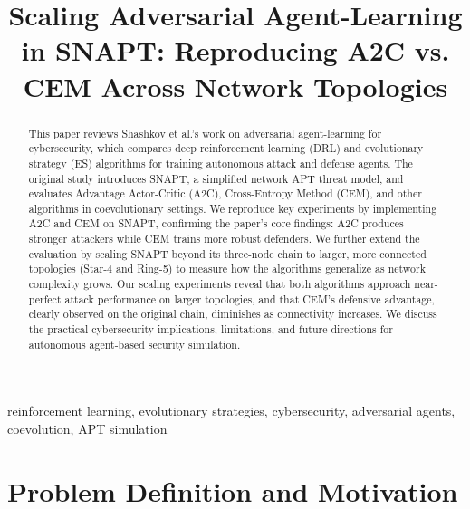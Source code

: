 \documentclass[conference, 10pt]{IEEEtran}
\begin{document}
\title{Scaling Adversarial Agent-Learning in SNAPT: Reproducing A2C vs. CEM Across Network Topologies}

\author{
}

\maketitle

\begin{abstract}
This paper reviews Shashkov et al.'s work on adversarial agent-learning for cybersecurity, which compares deep reinforcement learning (DRL) and evolutionary strategy (ES) algorithms for training autonomous attack and defense agents. The original study introduces SNAPT, a simplified network APT threat model, and evaluates Advantage Actor-Critic (A2C), Cross-Entropy Method (CEM), and other algorithms in coevolutionary settings. We reproduce key experiments by implementing A2C and CEM on SNAPT, confirming the paper's core findings: A2C produces stronger attackers while CEM trains more robust defenders. We further extend the evaluation by scaling SNAPT beyond its three-node chain to larger, more connected topologies (Star-4 and Ring-5) to measure how the algorithms generalize as network complexity grows. Our scaling experiments reveal that both algorithms approach near-perfect attack performance on larger topologies, and that CEM's defensive advantage, clearly observed on the original chain, diminishes as connectivity increases. We discuss the practical cybersecurity implications, limitations, and future directions for autonomous agent-based security simulation.
\end{abstract}

\begin{IEEEkeywords}
reinforcement learning, evolutionary strategies, cybersecurity, adversarial agents, coevolution, APT simulation
\end{IEEEkeywords}

\section{Problem Definition and Motivation}
\end{document}

